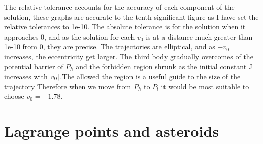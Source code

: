 \documentclass[11pt]{article}
\begin{document}
The relative tolerance accounts for the accuracy of each component of the solution, these graphs are accurate to the tenth significant figure as I have set the relative tolerances to 1e-10. The absolute tolerance is for the solution when it approaches 0, and as the solution for each $v_0$ is at a distance much greater than 1e-10 from 0, they are precise.
The trajectories are elliptical, and as $-v_0$ increases, the eccentricity get larger. The third body gradually overcomes of the potential barrier of $P_h$ and the forbidden region shrunk as the initial constant J increases with $\abs{v_0}$.The allowed the region is a useful guide to the size of the trajectory Therefore when we move from $P_h$ to $P_l$ it would be most suitable to choose $v_0 = -1.78$.
\section{Lagrange points and asteroids}
\end{document}
